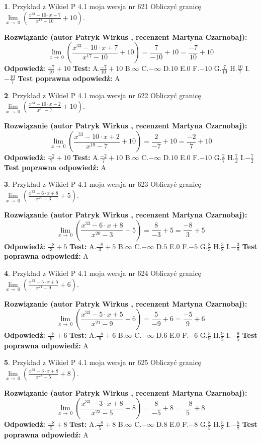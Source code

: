 \documentclass[12pt, a4paper]{article}
\theoremstyle{definition} %
\newtheorem{zad}{}
\newcommand{\zadStart}[1]{\begin{zad}#1\newline}
\newcommand{\zadStop}{\end{zad}}
\newcommand{\rozwStart}[2]{\noindent \textbf{Rozwiązanie (autor #1 , recenzent #2): }\newline}
\newcommand{\rozwStop}{\newline}
\newcommand{\odpStart}{\noindent \textbf{Odpowiedź:}\newline}
\newcommand{\odpStop}{\newline}
\newcommand{\testStart}{\noindent \textbf{Test:}\newline}
\newcommand{\testStop}{\newline}
\newcommand{\kluczStart}{\noindent \textbf{Test poprawna odpowiedź:}\newline}
\newcommand{\kluczStop}{\newline}
\begin{document}
\zadStart{Przykład z Wikieł P 4.1 moja wersja nr 621}
Obliczyć granicę $\lim\limits_{x\to\ 0}(\frac{x^{33}-10 \cdot x +7}{x^{17}-10}+10)$.
\zadStop
\rozwStart{Patryk Wirkus}{Martyna Czarnobaj}
$$\lim\limits_{x\to\ 0}(\frac{x^{33}-10 \cdot x +7}{x^{17}-10}+10)=\frac{7}{-10}+10=\frac{-7}{10}+10$$
\rozwStop
\odpStart
$\frac{-7}{10}+10$
\odpStop
\testStart
A.$\frac{-7}{10}+10$
B.$\infty$
C.$-\infty$
D.$10$
E.$0$
F.$-10$
G.$\frac{7}{10}$
H.$\frac{10}{7}$
I.$-\frac{10}{7}$
\testStop
\kluczStart
A
\kluczStop



\zadStart{Przykład z Wikieł P 4.1 moja wersja nr 622}
Obliczyć granicę $\lim\limits_{x\to\ 0}(\frac{x^{33}-10 \cdot x +2}{x^{19}-7}+10)$.
\zadStop
\rozwStart{Patryk Wirkus}{Martyna Czarnobaj}
$$\lim\limits_{x\to\ 0}(\frac{x^{33}-10 \cdot x +2}{x^{19}-7}+10)=\frac{2}{-7}+10=\frac{-2}{7}+10$$
\rozwStop
\odpStart
$\frac{-2}{7}+10$
\odpStop
\testStart
A.$\frac{-2}{7}+10$
B.$\infty$
C.$-\infty$
D.$10$
E.$0$
F.$-10$
G.$\frac{2}{7}$
H.$\frac{7}{2}$
I.$-\frac{7}{2}$
\testStop
\kluczStart
A
\kluczStop



\zadStart{Przykład z Wikieł P 4.1 moja wersja nr 623}
Obliczyć granicę $\lim\limits_{x\to\ 0}(\frac{x^{33}-6 \cdot x +8}{x^{20}-3}+5)$.
\zadStop
\rozwStart{Patryk Wirkus}{Martyna Czarnobaj}
$$\lim\limits_{x\to\ 0}(\frac{x^{33}-6 \cdot x +8}{x^{20}-3}+5)=\frac{8}{-3}+5=\frac{-8}{3}+5$$
\rozwStop
\odpStart
$\frac{-8}{3}+5$
\odpStop
\testStart
A.$\frac{-8}{3}+5$
B.$\infty$
C.$-\infty$
D.$5$
E.$0$
F.$-5$
G.$\frac{8}{3}$
H.$\frac{3}{8}$
I.$-\frac{3}{8}$
\testStop
\kluczStart
A
\kluczStop



\zadStart{Przykład z Wikieł P 4.1 moja wersja nr 624}
Obliczyć granicę $\lim\limits_{x\to\ 0}(\frac{x^{33}-5 \cdot x +5}{x^{21}-9}+6)$.
\zadStop
\rozwStart{Patryk Wirkus}{Martyna Czarnobaj}
$$\lim\limits_{x\to\ 0}(\frac{x^{33}-5 \cdot x +5}{x^{21}-9}+6)=\frac{5}{-9}+6=\frac{-5}{9}+6$$
\rozwStop
\odpStart
$\frac{-5}{9}+6$
\odpStop
\testStart
A.$\frac{-5}{9}+6$
B.$\infty$
C.$-\infty$
D.$6$
E.$0$
F.$-6$
G.$\frac{5}{9}$
H.$\frac{9}{5}$
I.$-\frac{9}{5}$
\testStop
\kluczStart
A
\kluczStop



\zadStart{Przykład z Wikieł P 4.1 moja wersja nr 625}
Obliczyć granicę $\lim\limits_{x\to\ 0}(\frac{x^{33}-3 \cdot x +8}{x^{23}-5}+8)$.
\zadStop
\rozwStart{Patryk Wirkus}{Martyna Czarnobaj}
$$\lim\limits_{x\to\ 0}(\frac{x^{33}-3 \cdot x +8}{x^{23}-5}+8)=\frac{8}{-5}+8=\frac{-8}{5}+8$$
\rozwStop
\odpStart
$\frac{-8}{5}+8$
\odpStop
\testStart
A.$\frac{-8}{5}+8$
B.$\infty$
C.$-\infty$
D.$8$
E.$0$
F.$-8$
G.$\frac{8}{5}$
H.$\frac{5}{8}$
I.$-\frac{5}{8}$
\testStop
\kluczStart
A
\kluczStop
\end{document}
